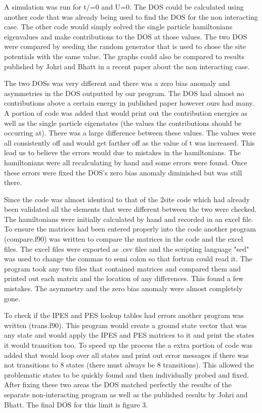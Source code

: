 \documentclass{article}
\begin{document}
A simulation was run for t/=0 and U=0. The DOS could be calculated using another code that was already being used to find the DOS for the non interacting case. The other code would simply solved the single particle hamiltonians eigenvalues and make contributions to the DOS at those values. The two DOS were compared by seeding the random generator that is used to chose the site potentials with the same value. The graphs could also be compared to results published by Johri and Bhatt in a recent paper about the non interacting case.

The two DOSs was very different and there was a zero bias anomaly and asymmetries in the DOS outputted by our program. The DOS had almost no contributions above a certain energy in published paper however ours had many. A portion of code was added that would print out the contribution energies as well as the single particle eigenstates (the values the contributions should be occurring at). There was a large difference between these values. The values were all consistently off and would get farther off as the value of t was increased. This lead us to believe the errors would due to mistakes in the hamiltonians. The hamiltonians were all recalculating by hand and some errors were found. Once these errors were fixed the DOS's zero bias anomaly diminished but was still there.

Since the code was almost identical to that of the 2site code which had already been validated all the elements that were different between the two were checked. The hamiltonians were initially calculated by hand and recorded in an excel file. To ensure the matrices had been entered properly into the code another program (compare.f90) was written to compare the matrices in the code and the excel files. The excel files were exported as .csv files and the scripting language "sed" was used to change the commas to semi colon so that fortran could read it. The program took any two files that contained matrices and compared them and printed out each matrix and the location of any differences. This found a few mistakes. The asymmetry and the zero bias anomaly were almost completely gone.

To check if the IPES and PES lookup tables had errors another program was written (trans.f90). This program would create a ground state vector that was any state and would apply the IPES and PES matrices to it and print the states it would transition too. To speed up the process the a extra portion of code was added that would loop over all states and print out error messages if there was not transitions to 8 states (there must always be 8 transitions). This allowed the problematic states to be quickly found and then individually probed and fixed. After fixing these two areas the DOS matched perfectly the results of the separate non-interacting program as well as the published results by Johri and Bhatt. The final DOS for this limit is figure 3.
\end{document}
